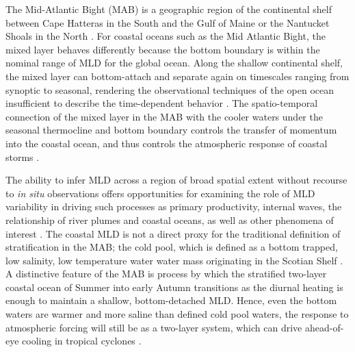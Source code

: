 \documentclass{article}
\begin{document}
The Mid-Atlantic Bight (MAB) is a geographic region of the continental shelf between Cape Hatteras in the South and the Gulf of Maine or the Nantucket Shoals in the North \cite{Houghton1982}.
For coastal oceans such as the Mid Atlantic Bight, the mixed layer behaves differently because the bottom boundary is within the nominal range of MLD for the global ocean.
Along the shallow continental shelf, the mixed layer can bottom-attach and separate again on timescales ranging from synoptic to seasonal, rendering the observational techniques of the open ocean insufficient to describe the time-dependent behavior \cite{Mountain2003,Seroka2016}. 
The spatio-temporal connection of the mixed layer in the MAB with the cooler waters under the seasonal thermocline and bottom boundary controls the transfer of momentum into the coastal ocean, and thus controls the atmospheric response of coastal storms \cite{Miles2013}.


The ability to infer MLD across a region of broad spatial extent without recourse to \textit{in situ} observations offers opportunities for examining the role of MLD variability in driving such processes as primary productivity, internal waves, the relationship of river plumes and coastal oceans, as well as other phenomena of interest \cite{Flagg2006,Moum2008,Chant2012,Carvalho2017}.
The coastal MLD is not a direct proxy for the traditional definition of stratification in the MAB; the cold pool, which is defined as a bottom trapped, low salinity, low temperature water water mass originating in the Scotian Shelf \cite{bigelow1933studies,Houghton1982,Mountain2003,Lentz2008,Zhang2014}.
A distinctive feature of the MAB is process by which the stratified two-layer coastal ocean of Summer into early Autumn transitions as the diurnal heating is enough to maintain a shallow, bottom-detached MLD.
Hence, even the bottom waters are warmer and more saline than defined cold pool waters, the response to atmospheric forcing will still be as a two-layer system, which can drive ahead-of-eye cooling in tropical cyclones \cite{Lentz1992,Lentz2014,Seroka2016}. 
\end{document}
